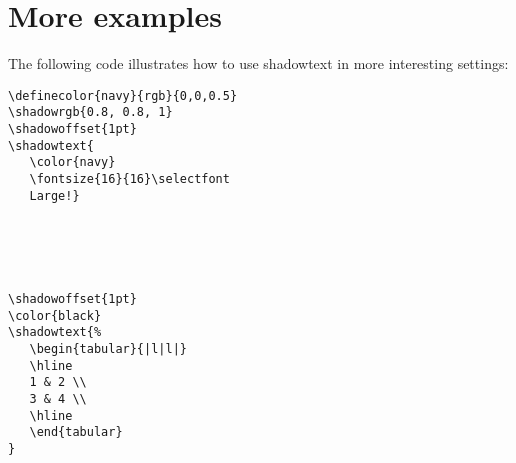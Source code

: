 \documentclass{article}
\begin{document}
\section{More examples}
The following code illustrates how to use shadowtext in more interesting settings:


\begin{minipage}{\textwidth}
\begin{multicols*}{2} 
{\footnotesize
\begin{verbatim}
\definecolor{navy}{rgb}{0,0,0.5}
\shadowrgb{0.8, 0.8, 1}
\shadowoffset{1pt}
\shadowtext{
   \color{navy}
   \fontsize{16}{16}\selectfont
   Large!}
\end{verbatim}}

\color{navy}
\shadowoffset{2pt}
\\
\phantom{}\\
\phantom{}\\
\phantom{}
\end{multicols*}
\end{minipage}


\color{black}




\begin{minipage}{\textwidth}
\begin{multicols*}{2} 
{\footnotesize
\begin{verbatim}
\shadowoffset{1pt}
\color{black}
\shadowtext{%
   \begin{tabular}{|l|l|}
   \hline
   1 & 2 \\
   3 & 4 \\
   \hline
   \end{tabular}
}
\end{verbatim}}

\shadowoffset{1pt}
\phantom{}\\
\phantom{}\\
\phantom{}\\
\phantom{}\\
\phantom{}\\
\phantom{}
\end{multicols*}
\end{minipage}
\end{document}
